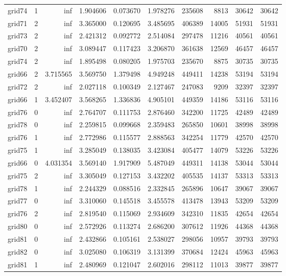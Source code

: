 \begin{longtable}{|l|r|r|r|r|r|r|r|r|r|}
grid74 & 1 & inf & 1.904606 & 0.073670 & 1.978276 & 235608 & 8813 & 30642 & 30642 \\
grid71 & 2 & inf & 3.365000 & 0.120695 & 3.485695 & 406389 & 14005 & 51931 & 51931 \\
grid73 & 2 & inf & 2.421312 & 0.092772 & 2.514084 & 297478 & 11216 & 40561 & 40561 \\
grid70 & 2 & inf & 3.089447 & 0.117423 & 3.206870 & 361638 & 12569 & 46457 & 46457 \\
grid74 & 2 & inf & 1.895498 & 0.080205 & 1.975703 & 235670 & 8875 & 30735 & 30735 \\
grid66 & 2 & 3.715565 & 3.569750 & 1.379498 & 4.949248 & 449411 & 14238 & 53194 & 53194 \\
grid72 & 2 & inf & 2.027118 & 0.100349 & 2.127467 & 247083 & 9209 & 32397 & 32397 \\
grid66 & 1 & 3.452407 & 3.568265 & 1.336836 & 4.905101 & 449359 & 14186 & 53116 & 53116 \\
grid76 & 0 & inf & 2.764707 & 0.111753 & 2.876460 & 342200 & 11725 & 42489 & 42489 \\
grid78 & 0 & inf & 2.259815 & 0.099668 & 2.359483 & 265850 & 10601 & 38998 & 38998 \\
grid76 & 1 & inf & 2.772986 & 0.115577 & 2.888563 & 342254 & 11779 & 42570 & 42570 \\
grid75 & 1 & inf & 3.285049 & 0.138035 & 3.423084 & 405477 & 14079 & 53226 & 53226 \\
grid66 & 0 & 4.031354 & 3.569140 & 1.917909 & 5.487049 & 449311 & 14138 & 53044 & 53044 \\
grid75 & 2 & inf & 3.305049 & 0.127153 & 3.432202 & 405535 & 14137 & 53313 & 53313 \\
grid78 & 1 & inf & 2.244329 & 0.088516 & 2.332845 & 265896 & 10647 & 39067 & 39067 \\
grid77 & 0 & inf & 3.310060 & 0.145518 & 3.455578 & 413478 & 13943 & 53209 & 53209 \\
grid76 & 2 & inf & 2.819540 & 0.115069 & 2.934609 & 342310 & 11835 & 42654 & 42654 \\
grid80 & 0 & inf & 2.572926 & 0.113274 & 2.686200 & 307612 & 11926 & 44368 & 44368 \\
grid81 & 0 & inf & 2.432866 & 0.105161 & 2.538027 & 298056 & 10957 & 39793 & 39793 \\
grid82 & 0 & inf & 3.025080 & 0.106319 & 3.131399 & 370684 & 12424 & 45963 & 45963 \\
grid81 & 1 & inf & 2.480969 & 0.121047 & 2.602016 & 298112 & 11013 & 39877 & 39877 \\

\end{longtable}
